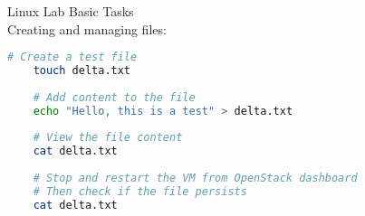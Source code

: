 \begin{example2}{Linux Lab Basic Tasks}\\
    Creating and managing files:
    \begin{lstlisting}[language=bash, style=basesmol]
    # Create a test file
    touch delta.txt
    
    # Add content to the file
    echo "Hello, this is a test" > delta.txt
    
    # View the file content
    cat delta.txt
    
    # Stop and restart the VM from OpenStack dashboard
    # Then check if the file persists
    cat delta.txt
    \end{lstlisting}
\end{example2}